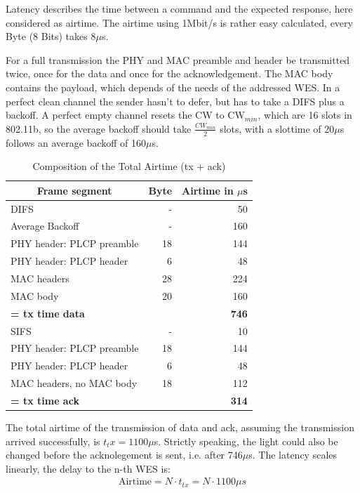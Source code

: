 Latency describes the time between a command and the expected response, here considered as airtime.
The airtime using 1Mbit/s is rather easy calculated, every Byte (8 Bits) takes 8$\mu$s.

For a full transmission the PHY and MAC preamble and header be transmitted twice, once for the data and once for the acknowledgement.
The MAC body contains the payload, which depends of the needs of the addressed \ac{WES}.
In a perfect clean channel the sender hasn't to defer, but has to take a \ac{DIFS} plus a backoff.
A perfect empty channel resets the CW to CW$_{min}$, which are 16 slots in 802.11b,
so the average backoff should take $\frac{CW_{min}}{2}$ slots, with a slottime of 20$\mu$s follows an average backoff of 160$\mu$s.

\begin{table}[h]
	\centering
	\begin{tabular} { lrr }
		\toprule
		\multicolumn{1}{c}{Frame segment}
		& \multicolumn{1}{c}{Byte}
		& \multicolumn{1}{c}{Airtime in $\mu$s} \\
		\midrule
		DIFS								& -		& 50 \\
		Average Backoff						& -		& 160 \\
		PHY header: PLCP preamble			& 18	& 144 \\
		PHY header: PLCP header				& 6 	& 48 \\
		MAC headers							& 28	& 224 \\
		MAC body							& 20 	& 160 \\
		\textbf{= tx time data}				& 		& \textbf{746} \\
		SIFS								& -		& 10 \\
		PHY header: PLCP preamble			& 18	& 144 \\
		PHY header: PLCP header				& 6		& 48 \\
		MAC headers, no MAC body	 		& 18	& 112 \\
		\textbf{= tx time ack}				& 		& \textbf{314} \\
		\bottomrule
	\end{tabular}
	\caption{Composition of the Total Airtime (tx + ack)}
	\label{tab:airtime_unicast_calc}
\end{table}

The total airtime of the transmission of data and ack, assuming the transmission arrived successfully, is $t_tx=1100\mu$s.
Strictly speaking, the light could also be changed before the acknolegement is sent, i.e. after 746$\mu$s.
The latency scales linearly, the delay to the n-th WES is:
\begin{align}
	\text{Airtime} = N \cdot t_{tx} = N \cdot 1100\mu s
\end{align}

